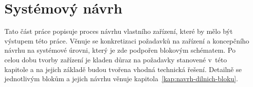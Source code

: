\chapter{Systémový návrh}

Tato část práce popisuje proces návrhu vlastního zařízení, které by mělo být výstupem této práce. Věnuje se konkretizaci požadavků na zařízení a koncepčního návrhu na systémové úrovni, který je zde podpořen blokovým schématem. Po celou dobu tvorby zařízení je kladen důraz na požadavky stanovené v~této kapitole a na jejich základě budou tvořena vhodná technická řešení.  Detailně se jednotlivým blokům a jejich návrhu věnuje kapitola~\ref{kap:navrh-dilnich-bloku}.














